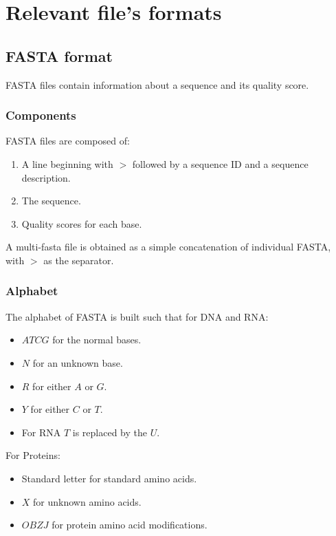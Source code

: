 \graphicspath{{chapters/laboratory/01/images/}}
\chapter{Relevant file's formats}

\section{FASTA format}
FASTA files contain information about a sequence and its quality score.

	\subsection{Components}
	FASTA files are composed of:

	\begin{multicols}{2}
		\begin{enumerate}
			\item A line beginning with $>$ followed by a sequence ID and a sequence description.
			\item The sequence.
			\item Quality scores for each base.
		\end{enumerate}
	\end{multicols}

	A multi-fasta file is obtained as a simple concatenation of individual FASTA, with $>$ as the separator.

	\subsection{Alphabet}
	The alphabet of FASTA is built such that for DNA and RNA:

	\begin{multicols}{2}
		\begin{itemize}
			\item $ATCG$ for the normal bases.
			\item $N$ for an unknown base.
			\item $R$ for either $A$ or $G$.
			\item $Y$ for either $C$ or $T$.
			\item For RNA $T$ is replaced by the $U$.
		\end{itemize}
	\end{multicols}

	For Proteins:

	\begin{multicols}{2}
		\begin{itemize}
			\item Standard letter for standard amino acids.
			\item $X$ for unknown amino acids.
			\item $OBZJ$ for protein amino acid modifications.
		\end{itemize}
	\end{multicols}

